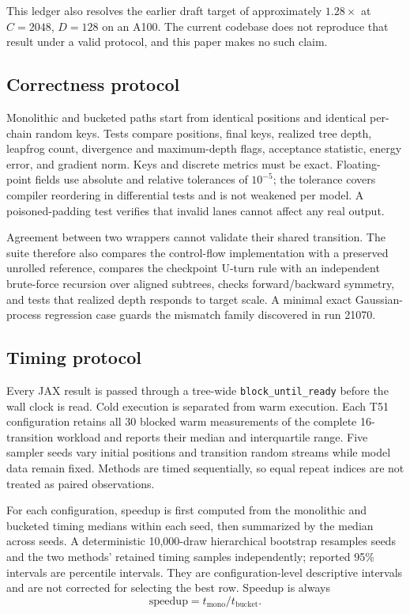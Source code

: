 \documentclass[conference]{IEEEtran}
\begin{document}
This ledger also resolves the earlier draft target of approximately
$1.28\times$ at $C=2048$, $D=128$ on an A100.  The current codebase does not
reproduce that result under a valid protocol, and this paper makes no such
claim.

\subsection{Correctness protocol}

Monolithic and bucketed paths start from identical positions and identical
per-chain random keys.  Tests compare positions, final keys, realized tree
depth, leapfrog count, divergence and maximum-depth flags, acceptance
statistic, energy error, and gradient norm.  Keys and discrete metrics must be
exact.  Floating-point fields use absolute and relative tolerances of
$10^{-5}$; the tolerance covers compiler reordering in differential tests and
is not weakened per model.  A poisoned-padding test verifies that invalid lanes
cannot affect any real output.

Agreement between two wrappers cannot validate their shared transition.  The
suite therefore also compares the control-flow implementation with a preserved
unrolled reference, compares the checkpoint U-turn rule with an independent
brute-force recursion over aligned subtrees, checks forward/backward symmetry,
and tests that realized depth responds to target scale.  A minimal exact
Gaussian-process regression case guards the mismatch family discovered in run
21070.

\subsection{Timing protocol}

Every JAX result is passed through a tree-wide \texttt{block\_until\_ready}
before the wall clock is read.  Cold execution is separated from warm
execution.  Each T51 configuration retains all 30 blocked warm measurements of
the complete 16-transition workload and reports their median and interquartile
range.  Five sampler seeds vary initial positions and transition random streams
while model data remain fixed.  Methods are timed sequentially, so equal repeat
indices are not treated as paired observations.

For each configuration, speedup is first computed from the monolithic and
bucketed timing medians within each seed, then summarized by the median across
seeds.  A deterministic 10,000-draw hierarchical bootstrap resamples seeds and
the two methods' retained timing samples independently; reported 95\% intervals
are percentile intervals.  They are configuration-level descriptive intervals
and are not corrected for selecting the best row.  Speedup is always
\begin{equation}
  \mathrm{speedup}=t_{\mathrm{mono}}/t_{\mathrm{bucket}}.
\end{equation}
\end{document}
